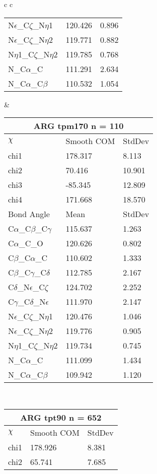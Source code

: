 \begin{longtable}{ c c }
\begin{tabular}{ l l l }
  N$\epsilon$\_C$\zeta$\_N$\eta$1 & 120.426 & 0.896\\
  N$\epsilon$\_C$\zeta$\_N$\eta$2 & 119.771 & 0.882\\
  N$\eta$1\_C$\zeta$\_N$\eta$2 & 119.785 & 0.768\\
  N\_C$\alpha$\_C & 111.291 & 2.634\\
  N\_C$\alpha$\_C$\beta$ & 110.532 & 1.054\\
  \bottomrule
  \end{tabular}
  &
  \begin{tabular}{ l l l }
  \toprule
  \multicolumn{3}{c}{ARG \textbf{tpm170} n = 110} \\ \toprule
  $\chi$       & Smooth COM & StdDev \\ \midrule
  chi1 & 178.317 & 8.113 \\ 
  chi2 & 70.416 & 10.901 \\ 
  chi3 & -85.345 & 12.809 \\ 
  chi4 & 171.668 & 18.570 \\ \midrule
  Bond Angle   & Mean     & StdDev \\ \midrule
  C$\alpha$\_C$\beta$\_C$\gamma$ & 115.637 & 1.263\\
  C$\alpha$\_C\_O & 120.626 & 0.802\\
  C$\beta$\_C$\alpha$\_C & 110.602 & 1.333\\
  C$\beta$\_C$\gamma$\_C$\delta$ & 112.785 & 2.167\\
  C$\delta$\_N$\epsilon$\_C$\zeta$ & 124.702 & 2.252\\
  C$\gamma$\_C$\delta$\_N$\epsilon$ & 111.970 & 2.147\\
  N$\epsilon$\_C$\zeta$\_N$\eta$1 & 120.476 & 1.046\\
  N$\epsilon$\_C$\zeta$\_N$\eta$2 & 119.776 & 0.905\\
  N$\eta$1\_C$\zeta$\_N$\eta$2 & 119.734 & 0.745\\
  N\_C$\alpha$\_C & 111.099 & 1.434\\
  N\_C$\alpha$\_C$\beta$ & 109.942 & 1.120\\
  \bottomrule
  \end{tabular}
  \\
  \begin{tabular}{ l l l }
  \toprule
  \multicolumn{3}{c}{ARG \textbf{tpt90} n = 652} \\ \toprule
  $\chi$       & Smooth COM & StdDev \\ \midrule
  chi1 & 178.926 & 8.381 \\ 
  chi2 & 65.741 & 7.685 \\ 

\end{tabular}
\end{longtable}
